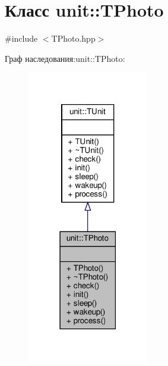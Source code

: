 \hypertarget{classunit_1_1_t_photo}{}\section{Класс unit\+:\+:T\+Photo}
\label{classunit_1_1_t_photo}


{\ttfamily \#include $<$T\+Photo.\+hpp$>$}



Граф наследования\+:unit\+:\+:T\+Photo\+:\nopagebreak
\begin{figure}[H]
\begin{center}
\leavevmode
\includegraphics[width=150pt]{classunit_1_1_t_photo__inherit__graph}
\end{center}
\end{figure}


